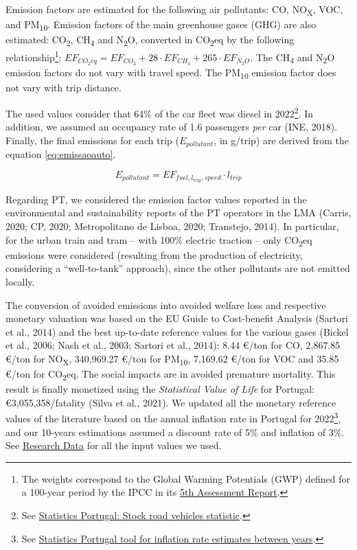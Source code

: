\documentclass[review, doubleblind, 3p,
authoryear]{elsarticle} %
\begin{document}
Emission factors are estimated for the following air pollutants: CO,
NO\textsubscript{X}, VOC, and PM\textsubscript{10}. Emission factors of
the main greenhouse gases (GHG) are also estimated: CO\textsubscript{2},
CH\textsubscript{4} and N\textsubscript{2}O, converted in
CO\textsubscript{2}eq by the following relationship\footnote{The weights
  correspond to the Global Warming Potentials (GWP) defined for a
  100-year period by the IPCC in its
  \href{https://www.ipcc.ch/report/ar5/}{5th Assessment Report}.}:
\(EF_{CO_2eq} = EF_{CO_2} + 28\cdot EF_{CH_4} + 265\cdot EF_{N_2O}\).
The CH\textsubscript{4} and N\textsubscript{2}O emission factors do not
vary with travel speed. The PM\textsubscript{10} emission factor does
not vary with trip distance.

The used values consider that 64\% of the car fleet was diesel in
2022\footnote{See
  \href{https://smi.ine.pt/Indicador/Detalhes/10837?LANG=EN}{Statistics
  Portugal: Stock road vehicles statistic}.}. In addition, we assumed an
occupancy rate of 1.6 passengers \emph{per} car (INE, 2018). Finally,
the final emissions for each trip (\(E_{pollutant}\), in g/trip) are
derived from the equation \ref{eq:emissaoauto}.

\begin{equation}\label{eq:emissaoauto}
{E}_{pollutant} = {EF}_{fuel,l_{trip},speed}\cdot l_{trip}
\end{equation}

Regarding PT, we considered the emission factor values reported in the
environmental and sustainability reports of the PT operators in the LMA
(Carris, 2020; CP, 2020; Metropolitano de Lisboa, 2020; Transtejo,
2014). In particular, for the urban train and tram -- with 100\%
electric traction -- only CO\textsubscript{2}eq emissions were
considered (resulting from the production of electricity, considering a
``well-to-tank'' approach), since the other pollutants are not emitted
locally.

The conversion of avoided emissions into avoided welfare loss and
respective monetary valuation was based on the EU Guide to Cost-benefit
Analysis (Sartori et al., 2014) and the best up-to-date reference values
for the various gases (Bickel et al., 2006; Nash et al., 2003; Sartori
et al., 2014): 8.44 €/ton for CO, 2,867.85 €/ton for
NO\textsubscript{X}, 340,969.27 €/ton for PM\textsubscript{10}, 7,169.62
€/ton for VOC and 35.85 €/ton for CO\textsubscript{2}eq. The social
impacts are in avoided premature mortality. This result is finally
monetized using the \emph{Statistical Value of Life} for Portugal:
€3,055,358/fatality (Silva et al., 2021). We updated all the monetary
reference values of the literature based on the annual inflation rate in
Portugal for 2022\footnote{See
  \href{https://www.ine.pt/xportal/xmain?xpid=INE\&xpgid=ipc}{Statistics
  Portugal tool for inflation rate estimates between years}.}, and our
10-years estimations assumed a discount rate of 5\% and inflation of
3\%. See \protect\hyperlink{research-data}{Research Data} for all the
input values we used.
\end{document}
